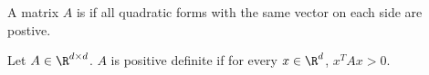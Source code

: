 
\sbasic




















\sstart
{}



A matrix $A$ is 
if all quadratic forms with the
same vector on each side are postive.


Let $A \in \R^{d \times d}$. $A$
is positive definite if for every
$x \in \R^d$, $x^T A x > 0$.
\strats
